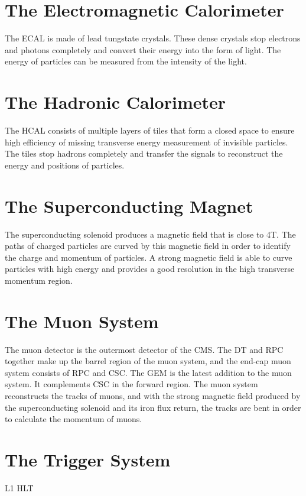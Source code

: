 \section{The Electromagnetic Calorimeter}
\label{sec:ECAL}

The \ac{ECAL} is made of lead tungstate crystals. These dense crystals stop electrons and photons completely and convert their energy into the form of light. The energy of particles can be measured from the intensity of the light.

\section{The Hadronic Calorimeter}
\label{sec:HCAL}

The \ac{HCAL} consists of multiple layers of tiles that form a closed space to ensure high efficiency of missing transverse energy measurement of invisible particles. The tiles stop hadrons completely and transfer the signals to reconstruct the energy and positions of particles.

\section{The Superconducting Magnet}
\label{sec:Magnet}

The superconducting solenoid produces a magnetic field that is close to 4T. The paths of charged particles are curved by this magnetic field in order to identify the charge and momentum of particles. A strong magnetic field is able to curve particles with high energy and provides a good resolution in the high transverse momentum region.

\section{The Muon System}
\label{sec:MuonSys}

The muon detector is the outermost detector of the CMS. The \ac{DT} and \ac{RPC} together make up the barrel region of the muon system, and the end-cap muon system consists of \ac{RPC} and  \ac{CSC}. The \ac{GEM} is the latest addition to the muon system. It complements \ac{CSC} in the forward region. The muon system reconstructs the tracks of muons, and with the strong magnetic field produced by the superconducting solenoid and its iron flux return, the tracks are bent in order to calculate the momentum of muons.

\section{The Trigger System}
\label{sec:TrigSys}

\ac{L1} \ac{HLT} 
